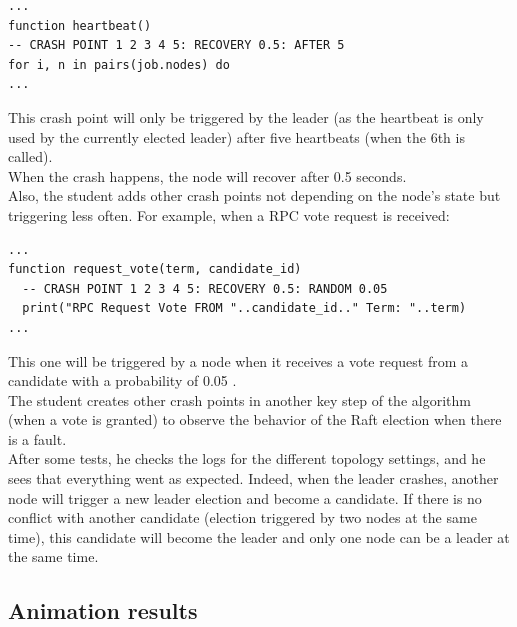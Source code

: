 \documentclass{eplmastersthesis}
\begin{document}
        \begin{lstlisting}[style=MyLua]
...
function heartbeat()
-- CRASH POINT 1 2 3 4 5: RECOVERY 0.5: AFTER 5
for i, n in pairs(job.nodes) do
...
        \end{lstlisting}

        This crash point will only be triggered by the leader (as the heartbeat
        is only used by the currently elected leader) after five heartbeats
        (when the 6th is called).\\
        When the crash happens, the node will recover after 0.5 seconds.\\
        Also, the student adds other crash points not depending on the
        node's state but triggering less often. For example, when a RPC vote
        request is received:

        \begin{lstlisting}[style=MyLua]
...
function request_vote(term, candidate_id)
  -- CRASH POINT 1 2 3 4 5: RECOVERY 0.5: RANDOM 0.05
  print("RPC Request Vote FROM "..candidate_id.." Term: "..term)
...
        \end{lstlisting}

        This one will be triggered by a node when it receives a vote request
        from a candidate with a probability of 0.05 .\\
        The student creates other crash points in another key step of
        the algorithm (when a vote is granted) to observe the behavior of
        the Raft election when there is a fault.\\

        After some tests, he checks the logs for the different topology
        settings, and he sees that everything went as expected. Indeed, when
        the leader crashes, another node will trigger a new leader
        election and become a candidate. If there is no conflict with another
        candidate (election triggered by two nodes at the same time), this
        candidate will become the leader and only one node can be a leader
        at the same time.

      \subsection{Animation results}
\end{document}
